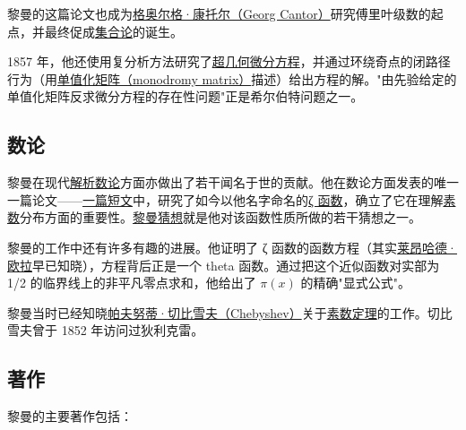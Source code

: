 黎曼的这篇论文也成为\href{https://en.wikipedia.org/wiki/Georg_Cantor}{格奥尔格·康托尔（Georg Cantor）}研究傅里叶级数的起点，并最终促成\href{https://en.wikipedia.org/wiki/Set_theory}{集合论}的诞生。

1857 年，他还使用复分析方法研究了\href{https://en.wikipedia.org/wiki/Hypergeometric_differential_equations}{超几何微分方程}，并通过环绕奇点的闭路径行为（用\href{https://en.wikipedia.org/wiki/Monodromy_matrix}{单值化矩阵（monodromy matrix）}描述）给出方程的解。"由先验给定的单值化矩阵反求微分方程的存在性问题"正是希尔伯特问题之一。


\subsection{数论}\label{Number_theory}

黎曼在现代\href{https://en.wikipedia.org/wiki/Analytic_number_theory}{解析数论}方面亦做出了若干闻名于世的贡献。他在数论方面发表的唯一一篇论文——\href{https://en.wikipedia.org/wiki/On_the_Number_of_Primes_Less_Than_a_Given_Magnitude}{一篇短文}中，研究了如今以他名字命名的\href{https://en.wikipedia.org/wiki/Riemann_zeta_function}{ζ 函数}，确立了它在理解\href{https://en.wikipedia.org/wiki/Prime_number}{素数}分布方面的重要性。\href{https://en.wikipedia.org/wiki/Riemann_hypothesis}{黎曼猜想}就是他对该函数性质所做的若干猜想之一。

黎曼的工作中还有许多有趣的进展。他证明了 ζ 函数的函数方程（其实\href{https://en.wikipedia.org/wiki/Leonhard_Euler}{莱昂哈德·欧拉}早已知晓），方程背后正是一个 theta 函数。通过把这个近似函数对实部为 1/2 的临界线上的非平凡零点求和，他给出了 {{\(\pi(x)\)}{}} 的精确"显式公式"。

黎曼当时已经知晓\href{https://en.wikipedia.org/wiki/Pafnuty_Chebyshev}{帕夫努蒂·切比雪夫（Chebyshev）}关于\href{https://en.wikipedia.org/wiki/Prime_number_theorem}{素数定理}的工作。切比雪夫曾于 1852 年访问过狄利克雷。


\subsection{著作}\label{Writings}

黎曼的主要著作包括：

